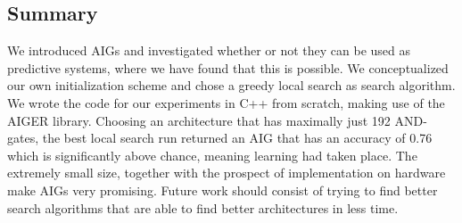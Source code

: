 \subsection{Summary}
We introduced AIGs and investigated whether or not they can be used as predictive systems, where we have found that this is possible. We conceptualized our own initialization scheme and chose a greedy local search as search algorithm. We wrote the code for our experiments in C++ from scratch, making use of the AIGER library. Choosing an architecture that has maximally just 192 AND-gates, the best local search run returned an AIG that has an accuracy of 0.76 which is significantly above chance, meaning learning had taken place. The extremely small size, together with the prospect of implementation on hardware make AIGs very promising. Future work should consist of trying to find better search algorithms that are able to find better architectures in less time.
